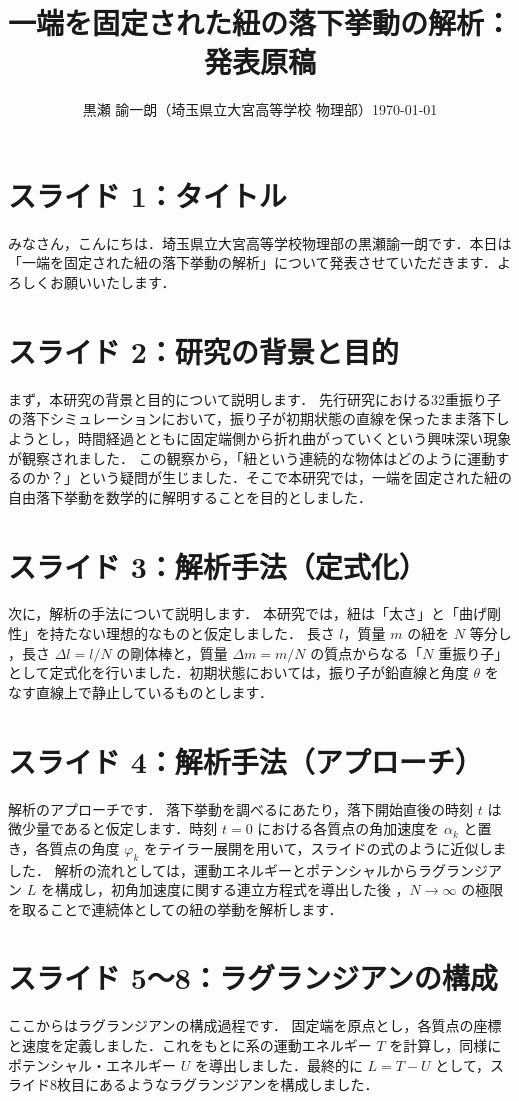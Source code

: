 \documentclass[9pt, twocolumn, a4paper]{ltjsarticle}
\title{\vspace{-15mm}\Large\textbf{一端を固定された紐の落下挙動の解析：発表原稿}}
\author{黒瀬 諭一朗（埼玉県立大宮高等学校 物理部）\quad \today}
\date{}
\begin{document}
\maketitle
\section{スライド 1：タイトル}
みなさん，こんにちは．埼玉県立大宮高等学校物理部の黒瀬諭一朗です．本日は「一端を固定された紐の落下挙動の解析」について発表させていただきます．よろしくお願いいたします．

\section{スライド 2：研究の背景と目的}
まず，本研究の背景と目的について説明します．
先行研究における32重振り子の落下シミュレーションにおいて，振り子が初期状態の直線を保ったまま落下しようとし，時間経過とともに固定端側から折れ曲がっていくという興味深い現象が観察されました．
この観察から，「紐という連続的な物体はどのように運動するのか？」という疑問が生じました．そこで本研究では，一端を固定された紐の自由落下挙動を数学的に解明することを目的としました．

\section{スライド 3：解析手法（定式化）}
次に，解析の手法について説明します．
本研究では，紐は「太さ」と「曲げ剛性」を持たない理想的なものと仮定しました．
長さ $l$，質量 $m$ の紐を $N$ 等分し ，長さ $\Delta l = l/N$ の剛体棒と，質量 $\Delta m = m/N$ の質点からなる「$N$ 重振り子」として定式化を行いました．初期状態においては，振り子が鉛直線と角度 $\theta$ をなす直線上で静止しているものとします．

\section{スライド 4：解析手法（アプローチ）}
解析のアプローチです．
落下挙動を調べるにあたり，落下開始直後の時刻 $t$ は微少量であると仮定します．時刻 $t=0$ における各質点の角加速度を $\alpha_k$ と置き，各質点の角度 $\varphi_k$ をテイラー展開を用いて，スライドの式のように近似しました．
解析の流れとしては，運動エネルギーとポテンシャルからラグランジアン $L$ を構成し，初角加速度に関する連立方程式を導出した後 ，$N \to \infty$ の極限を取ることで連続体としての紐の挙動を解析します．

\section{スライド 5〜8：ラグランジアンの構成}
ここからはラグランジアンの構成過程です．
固定端を原点とし，各質点の座標と速度を定義しました．これをもとに系の運動エネルギー $T$ を計算し，同様にポテンシャル・エネルギー $U$ を導出しました．最終的に $L = T - U$ として，スライド8枚目にあるようなラグランジアンを構成しました．
\end{document}

